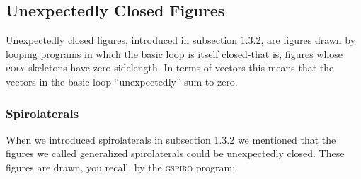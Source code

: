 \documentclass{book}
\begin{document}
\subsection{Unexpectedly Closed Figures}

Unexpectedly closed figures, introduced in subsection 1.3.2, are figures
drawn by looping programs in which the basic loop is itself closed-that
is, figures whose \textsc{poly} skeletons have zero sidelength. In terms of vectors
this means that the vectors in the basic loop ``unexpectedly'' sum to zero.


\subsubsection{Spirolaterals}

When we introduced spirolaterals in subsection 1.3.2 we mentioned that
the figures we called generalized spirolaterals could be unexpectedly
closed. These figures are drawn, you recall, by the \textsc{gspiro} program:
\end{document}
